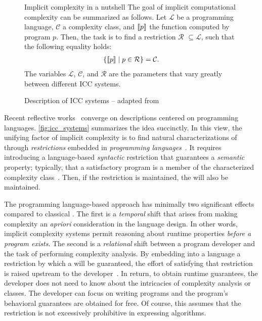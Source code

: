 \begin{figure}[t]
\begin{infobox}[]{Implicit complexity in a nutshell}
The goal of implicit computational complexity can be summarized as follows. Let
\(\mathcal{L}\) be a programming language,
\(\mathcal{C}\) a complexity class, and
\(\llbracket p\rrbracket\) the function computed by program \(p\).
Then, the task is to find a restriction \(\mathcal{R}\)
\(\subseteq \mathcal{L}\), such that the following equality holds:
\begin{align*}\{ \llbracket p\rrbracket \mid p \in \mathcal{R} \} = \mathcal{C}.\end{align*}
The variables \(\mathcal{L}\), \(\mathcal{C}\), and \(\mathcal{R}\) are the
parameters that vary greatly between different ICC systems.
\end{infobox}
\caption[Implicit complexity in a nutshell]
{Description of ICC systems -- adapted from~\textcite[p. 7]{pchoux2020}}
\label{fig:icc_systems}
\end{figure}

Recent reflective works~\cite{pchoux2020,hoffmann2022} converge on descriptions
centered on programming languages. \autoref{fig:icc_systems} summarizes the idea
succinctly. In this view, the unifying factor of implicit complexity is to find
natural characterizations of  through
\emph{restrictions} embedded in \emph{programming
languages}~\cite{hoffmann2022}. It requires introducing a language-based
\emph{syntactic} restriction that guarantees a \emph{semantic} property;
typically, that a satisfactory program is a member of the characterized
complexity class~\cite{moyen2017}. Then, if the
restriction is maintained, the  will also be maintained.

The programming language-based approach has minimally two significant effects
compared to classical . The first is a
\emph{temporal} shift that arises from making complexity an \emph{apriori}
consideration in the language design. In other words, implicit complexity
systems permit reasoning about runtime properties \emph{before a program
exists}. The second is a \emph{relational} shift between a program developer and
the task of performing complexity analysis. By
embedding into a language a restriction by which a  will be
guaranteed, the effort of satisfying that restriction is raised upstream to the
developer~\cite{moyen2017}. In return, to obtain runtime guarantees, the
developer does not need to know about the intricacies of complexity analysis or
classes. The developer can focus on writing programs and the program's
behavioral guarantees are obtained for free. Of course, this assumes that the
restriction is not excessively prohibitive in expressing algorithms.

